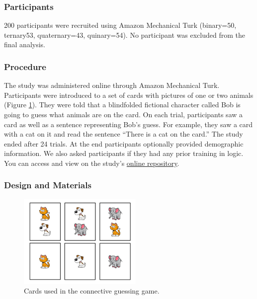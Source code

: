 \documentclass[floatsintext,man]{apa6}
\theoremstyle{definition}
\theoremstyle{definition}
\theoremstyle{definition}
\theoremstyle{remark}
\begin{document}
\subsubsection{Participants}\label{participants}

200 participants were recruited using Amazon Mechanical Turk (binary=50,
ternary53, quaternary=43, quinary=54). No participant was excluded from
the final analysis.

\subsubsection{Procedure}\label{procedure}

The study was administered online through Amazon Mechanical Turk.
Participants were introduced to a set of cards with pictures of one or
two animals (Figure \ref{fig:stimuli}). They were told that a
blindfolded fictional character called Bob is going to guess what
animals are on the card. On each trial, participants saw a card as well
as a sentence representing Bob's guess. For example, they saw a card
with a cat on it and read the sentence \enquote{There is a cat on the
card.} The study ended after 24 trials. At the end participants
optionally provided demographic information. We also asked participants
if they had any prior training in logic. You can access and view on the
study's \href{https://github.com/thegricean/si-paradigms/}{online
repository}.

\subsubsection{Design and Materials}\label{design-and-materials}

\begin{figure}[t]

{\centering \includegraphics{writeup_files/figure-latex/stimuli-1} 

}

\caption{Cards used in the connective guessing game.}\label{fig:stimuli}
\end{figure}
\end{document}

